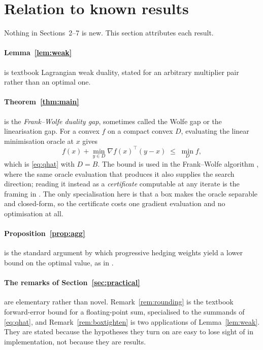 \documentclass[11pt]{article}
\theoremstyle{plain}
\theoremstyle{remark}
\begin{document}
\section{Relation to known results}\label{sec:literature}

Nothing in Sections~2--7 is new.  This section attributes each result.

\paragraph{Lemma~\ref{lem:weak}} is textbook Lagrangian weak duality, stated for
an arbitrary multiplier pair rather than an optimal one.

\paragraph{Theorem~\ref{thm:main}} is the \emph{Frank--Wolfe duality gap},
sometimes called the Wolfe gap or the linearisation gap.  For a convex $f$ on a
compact convex $D$, evaluating the linear minimisation oracle at $x$ gives
\[
  f(x) + \min_{y \in D} \nabla f(x)^{\top}(y - x) \;\le\; \min_{D} f ,
\]
which is \eqref{eq:qhat} with $D = B$.  The bound is used in the Frank--Wolfe
algorithm \cite{frankwolfe1956}, where the same oracle evaluation that produces
it also supplies the search direction; reading it instead as a
\emph{certificate} computable at any iterate is the framing in
\cite{jaggi2013}.  The only specialisation here is that a box makes the oracle
separable and closed-form, so the certificate costs one gradient evaluation and
no optimisation at all.

\paragraph{Proposition~\ref{prop:agg}} is the standard argument by which
progressive hedging weights yield a lower bound on the optimal value, as in
\cite{gade2016}.

\paragraph{The remarks of Section~\ref{sec:practical}} are elementary rather
than novel.  Remark~\ref{rem:rounding} is the textbook forward-error bound for a
floating-point sum, specialised to the summands of \eqref{eq:qhat}, and
Remark~\ref{rem:boxtighten} is two applications of Lemma~\ref{lem:weak}.  They
are stated because the hypotheses they turn on are easy to lose sight of in
implementation, not because they are results.
\end{document}
